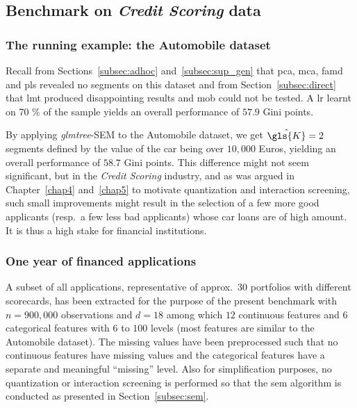 \subsection{Benchmark on \textit{Credit Scoring} data}

\subsubsection{The running example: the Automobile dataset}

Recall from Sections~\ref{subsec:adhoc} and~\ref{subsec:sup_gen} that \gls{pca}, \gls{mca}, \gls{famd} and \gls{pls} revealed no segments on this dataset and from Section~\ref{subsec:direct} that \gls{lmt} produced disappointing results and \gls{mob} could not be tested. A \gls{lr} learnt on 70 \% of the sample yields an overall performance of $57.9$ Gini points.

By applying \textit{glmtree}-SEM to the Automobile dataset, we get $\hat{\gls{K}} = 2$ segments defined by the 
value of the car being over $10{,}000$ Euros, yielding an overall performance of $58.7$ Gini points. This difference might not seem significant, but in the \textit{Credit Scoring} industry, and as was argued in Chapter~\ref{chap4} and~\ref{chap5} to motivate quantization and interaction screening, such small improvements might result in the selection of a few more good applicants (resp.\ a few less bad applicants) whose car loans are of high amount. It is thus a high stake for financial institutions.

%

\subsubsection{One year of financed applications}

A subset of all applications, representative of approx.\ $30$ portfolios with different scorecards, has been extracted for the purpose of the present benchmark with $n = 900{,}000$ observations and $d = 18$ among which $12$ continuous features and $6$ categorical features with $6$ to $100$ levels (most features are similar to the Automobile dataset). The missing values have been preprocessed such that no continuous features have missing values and the categorical features have a separate and meaningful ``missing'' level. Also for simplification purposes, no quantization or interaction screening is performed so that the \gls{sem} algorithm is conducted as presented in Section~\ref{subsec:sem}.

